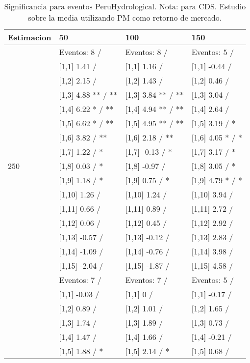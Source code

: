 \begin{table}

\caption{Significancia para eventos PeruHydrological. Nota: para CDS. Estudio sobre la media utilizando PM como retorno de mercado.}
\centering
\begin{tabular}[t]{llll}
\toprule
Estimacion & 50 & 100 & 150\\
\midrule
 & Eventos:  8 / & Eventos:  8 / & Eventos:  5 /\\
 & {}[1,1] 1.41  / & {}[1,1] 1.16  / & {}[1,1] -0.44  /\\
 & {}[1,2] 2.15  / & {}[1,2] 1.43  / & {}[1,2] 0.46  /\\
 & {}[1,3] 4.88 ** / ** & {}[1,3] 3.84 ** / ** & {}[1,3] 3.04  /\\
 & {}[1,4] 6.22 * / ** & {}[1,4] 4.94 ** / ** & {}[1,4] 2.64  /\\
\addlinespace
 & {}[1,5] 6.62 * / ** & {}[1,5] 4.95 ** / ** & {}[1,5] 3.19  / *\\
 & {}[1,6] 3.82  / ** & {}[1,6] 2.18  / ** & {}[1,6] 4.05 * / *\\
 & {}[1,7] 1.22  / * & {}[1,7] -0.13  / * & {}[1,7] 3.17  / *\\
250 & {}[1,8] 0.03  / * & {}[1,8] -0.97  / & {}[1,8] 3.05  / *\\
 & {}[1,9] 1.18  / * & {}[1,9] 0.75  / * & {}[1,9] 4.79 * / *\\
\addlinespace
 & {}[1,10] 1.26  / & {}[1,10] 1.24  / & {}[1,10] 3.94  /\\
 & {}[1,11] 0.66  / & {}[1,11] 0.89  / & {}[1,11] 2.72  /\\
 & {}[1,12] 0.06  / & {}[1,12] 0.45  / & {}[1,12] 2.92  /\\
 & {}[1,13] -0.57  / & {}[1,13] -0.12  / & {}[1,13] 2.83  /\\
 & {}[1,14] -1.09  / & {}[1,14] -0.76  / & {}[1,14] 3.98  /\\
\addlinespace
 & {}[1,15] -2.04  / & {}[1,15] -1.87  / & {}[1,15] 4.58  /\\
 & Eventos:  7 / & Eventos:  7 / & Eventos:  5 /\\
 & {}[1,1] -0.03  / & {}[1,1] 0  / & {}[1,1] -0.17  /\\
 & {}[1,2] 0.89  / & {}[1,2] 1.01  / & {}[1,2] 1.65  /\\
 & {}[1,3] 1.74  / & {}[1,3] 1.89  / & {}[1,3] 0.73  /\\
\addlinespace
 & {}[1,4] 1.47  / & {}[1,4] 1.66  / & {}[1,4] -0.21  /\\
 & {}[1,5] 1.88  / * & {}[1,5] 2.14  / * & {}[1,5] 0.68  /\\

\end{tabular}
\end{table}
